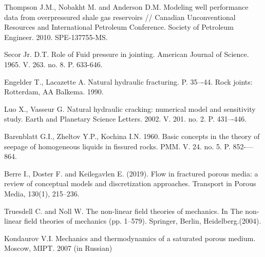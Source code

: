 \documentclass[article,authoryear,jpm]{beg_39}             %
\begin{document}
\begin{thebibliography}{-8}
{Thompson J.M., Nobakht M. and Anderson D.M. Modeling well performance data from overpressured shale gas reservoirs // Canadian Unconventional Resources and International Petroleum Conference. Society of Petroleum Engineer. 2010. SPE-137755-MS.

Secor Jr. D.T. Role of Fuid pressure in jointing. American Journal of Science. 1965. V. 263. no. 8. P. 633-646.

Engelder T., Lacazette A. Natural hydraulic fracturing. P. 35–-44. Rock joints: Rotterdam, AA Balkema. 1990.

Luo X., Vasseur G. Natural hydraulic cracking: numerical model and sensitivity study. Earth and Planetary Science Letters. 2002. V. 201. no. 2. P. 431–-446.

Barenblatt G.I., Zheltov Y.P., Kochina I.N. 1960. Basic concepts in the theory of seepage of homogeneous liquids in fissured rocks. PMM. V. 24. no. 5. P. 852-—864.

Berre I., Doster F. and Keilegavlen E. (2019). Flow in fractured porous media: a review of conceptual models and discretization approaches. Transport in Porous Media, 130(1), 215--236.

Truesdell C. and Noll W. The non-linear field theories of mechanics. In The non-linear field theories of mechanics (pp. 1--579). Springer, Berlin, Heidelberg.(2004).

Kondaurov V.I. Mechanics and thermodynamics of a saturated porous medium. Moscow, MIPT. 2007 (in Russian)



}

\end{thebibliography}


%

%
\end{document}
